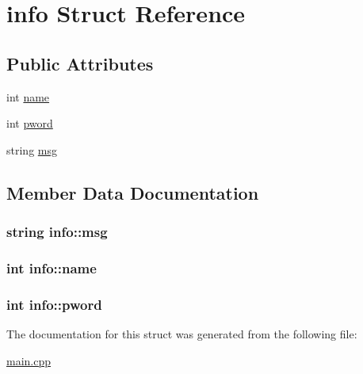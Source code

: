 \hypertarget{structinfo}{\section{info Struct Reference}
\label{structinfo}
}
\subsection*{Public Attributes}
\begin{DoxyCompactItemize}
\item 
int \hyperlink{structinfo_a8cb03e18cc1040a9bd15b661ccce2c87}{name}
\item 
int \hyperlink{structinfo_ae4b7cf772709b02067a422f5413839ca}{pword}
\item 
string \hyperlink{structinfo_a292cc4729b98ae6b13a47040cca007a4}{msg}
\end{DoxyCompactItemize}


\subsection{Member Data Documentation}
\hypertarget{structinfo_a292cc4729b98ae6b13a47040cca007a4}{
\subsubsection[{msg}]{\setlength{\rightskip}{0pt plus 5cm}string info\+::msg}}\label{structinfo_a292cc4729b98ae6b13a47040cca007a4}
\hypertarget{structinfo_a8cb03e18cc1040a9bd15b661ccce2c87}{
\subsubsection[{name}]{\setlength{\rightskip}{0pt plus 5cm}int info\+::name}}\label{structinfo_a8cb03e18cc1040a9bd15b661ccce2c87}
\hypertarget{structinfo_ae4b7cf772709b02067a422f5413839ca}{
\subsubsection[{pword}]{\setlength{\rightskip}{0pt plus 5cm}int info\+::pword}}\label{structinfo_ae4b7cf772709b02067a422f5413839ca}


The documentation for this struct was generated from the following file\+:\begin{DoxyCompactItemize}
\item 
\hyperlink{main_8cpp}{main.\+cpp}\end{DoxyCompactItemize}

